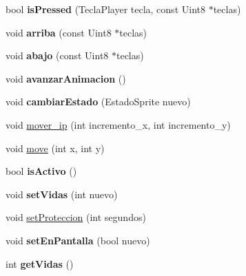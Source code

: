 \begin{DoxyCompactItemize}
\item 
bool {\bfseries is\+Pressed} (Tecla\+Player tecla, const Uint8 $\ast$teclas)\hypertarget{class_player_ad419831ee10e640f7d1b0dcf260d55cd}{}\label{class_player_ad419831ee10e640f7d1b0dcf260d55cd}

\item 
void {\bfseries arriba} (const Uint8 $\ast$teclas)\hypertarget{class_player_af8b5efff3494a47772ead1e026f337cd}{}\label{class_player_af8b5efff3494a47772ead1e026f337cd}

\item 
void {\bfseries abajo} (const Uint8 $\ast$teclas)\hypertarget{class_player_ad98a56271096fa93b68991038de58caf}{}\label{class_player_ad98a56271096fa93b68991038de58caf}

\item 
void {\bfseries avanzar\+Animacion} ()\hypertarget{class_player_a21d02dd621070ac4f41e33e2627776bd}{}\label{class_player_a21d02dd621070ac4f41e33e2627776bd}

\item 
void {\bfseries cambiar\+Estado} (Estado\+Sprite nuevo)\hypertarget{class_player_a038f253da5e506e19a1e24a4e6a5f3f5}{}\label{class_player_a038f253da5e506e19a1e24a4e6a5f3f5}

\item 
void \hyperlink{class_player_a3acc9e6aa183f86bf29f89982a42c6e6}{mover\+\_\+ip} (int incremento\+\_\+x, int incremento\+\_\+y)
\item 
void \hyperlink{class_player_aebb43c51a7da9e652f5574e8ded62f87}{move} (int x, int y)
\item 
bool {\bfseries is\+Activo} ()\hypertarget{class_player_a5a0f7e56c03a112fcee982cc840f661b}{}\label{class_player_a5a0f7e56c03a112fcee982cc840f661b}

\item 
void {\bfseries set\+Vidas} (int nuevo)\hypertarget{class_player_ac7a3107b816d747203be750a9b68771e}{}\label{class_player_ac7a3107b816d747203be750a9b68771e}

\item 
void \hyperlink{class_player_a23bedb65ce970474120640ae36cba19f}{set\+Proteccion} (int segundos)
\item 
void {\bfseries set\+En\+Pantalla} (bool nuevo)\hypertarget{class_player_a98a4100f1290b3e0ab6c5d93f1d764b7}{}\label{class_player_a98a4100f1290b3e0ab6c5d93f1d764b7}

\item 
int {\bfseries get\+Vidas} ()\hypertarget{class_player_a992cb9c9048c41b6c7d3640b65a54aca}{}\label{class_player_a992cb9c9048c41b6c7d3640b65a54aca}


\end{DoxyCompactItemize}
